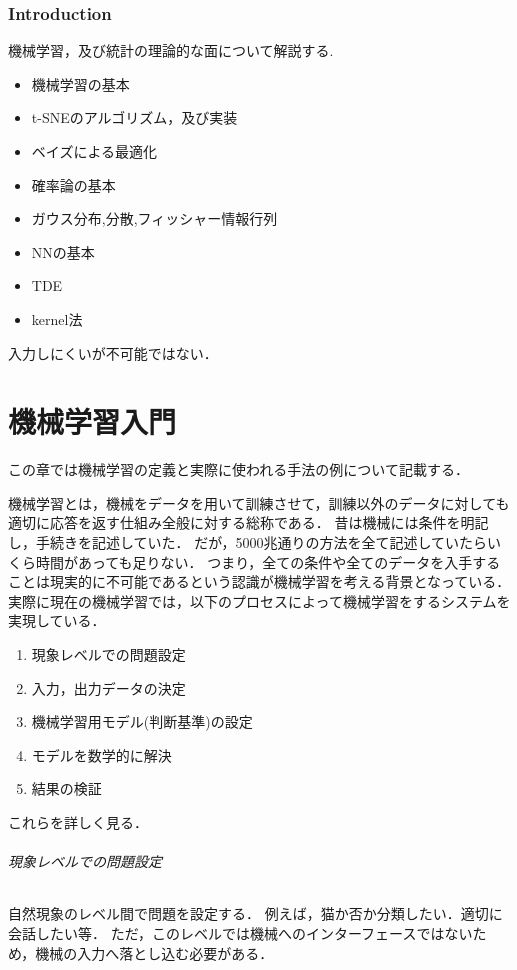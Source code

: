\documentclass{ujarticle}
\begin{document}
\section{Introduction}
\label{sec:Introduction}
機械学習，及び統計の理論的な面について解説する.

\begin{itemize}
  \item 機械学習の基本
  \item t-SNEのアルゴリズム，及び実装
  \item ベイズによる最適化
  \item 確率論の基本
  \item ガウス分布,分散,フィッシャー情報行列
  \item NNの基本
  \item TDE
  \item kernel法
\end{itemize}
入力しにくいが不可能ではない．


\part{機械学習入門}
この章では機械学習の定義と実際に使われる手法の例について記載する．

機械学習とは，機械をデータを用いて訓練させて，訓練以外のデータに対しても適切に応答を返す仕組み全般に対する総称である．
昔は機械には条件を明記し，手続きを記述していた．
だが，5000兆通りの方法を全て記述していたらいくら時間があっても足りない．
つまり，全ての条件や全てのデータを入手することは現実的に不可能であるという認識が機械学習を考える背景となっている．
実際に現在の機械学習では，以下のプロセスによって機械学習をするシステムを実現している．
\begin{enumerate}
  \item 現象レベルでの問題設定
  \item 入力，出力データの決定
  \item 機械学習用モデル(判断基準)の設定
  \item モデルを数学的に解決
  \item 結果の検証
\end{enumerate}
これらを詳しく見る．

\paragraph{現象レベルでの問題設定}
自然現象のレベル間で問題を設定する．
例えば，猫か否か分類したい．適切に会話したい等．
ただ，このレベルでは機械へのインターフェースではないため，機械の入力へ落とし込む必要がある．
\end{document}
